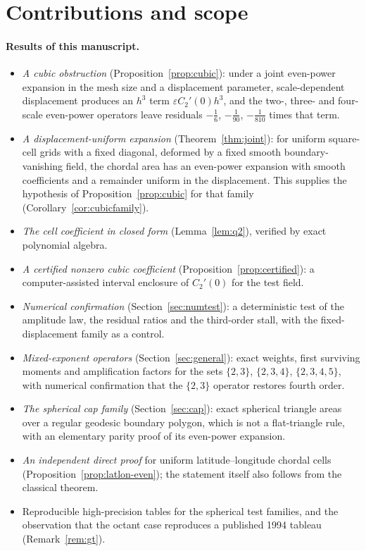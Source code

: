 \documentclass[11pt]{article}
\theoremstyle{remark}
\begin{document}
\section{Contributions and scope}\label{sec:scope}
\paragraph{Results of this manuscript.}
\begin{itemize}
\item \emph{A cubic obstruction} (Proposition~\ref{prop:cubic}): under a joint even-power
expansion in the mesh size and a displacement parameter, scale-dependent displacement
produces an $h^3$ term $\varepsilon C_2'(0)h^3$, and the two-, three- and four-scale
even-power operators leave residuals $-\tfrac16$, $-\tfrac1{90}$, $-\tfrac1{810}$ times that
term.
\item \emph{A displacement-uniform expansion} (Theorem~\ref{thm:joint}): for uniform
square-cell grids with a fixed diagonal, deformed by a fixed smooth boundary-vanishing field,
the chordal area has an even-power expansion with smooth coefficients and a remainder uniform
in the displacement. This supplies the hypothesis of Proposition~\ref{prop:cubic} for that
family (Corollary~\ref{cor:cubicfamily}).
\item \emph{The cell coefficient in closed form} (Lemma~\ref{lem:q2}), verified by exact
polynomial algebra.
\item \emph{A certified nonzero cubic coefficient} (Proposition~\ref{prop:certified}): a
computer-assisted interval enclosure of $C_2'(0)$ for the test field.
\item \emph{Numerical confirmation} (Section~\ref{sec:numtest}): a deterministic test of the
amplitude law, the residual ratios and the third-order stall, with the fixed-displacement
family as a control.
\item \emph{Mixed-exponent operators} (Section~\ref{sec:general}): exact weights, first
surviving moments and amplification factors for the sets $\{2,3\}$, $\{2,3,4\}$,
$\{2,3,4,5\}$, with numerical confirmation that the $\{2,3\}$ operator restores fourth order.
\item \emph{The spherical cap family} (Section~\ref{sec:cap}): exact spherical triangle areas
over a regular geodesic boundary polygon, which is not a flat-triangle rule, with an
elementary parity proof of its even-power expansion.
\item \emph{An independent direct proof} for uniform latitude--longitude chordal cells
(Proposition~\ref{prop:latlon-even}); the statement itself also follows from the classical
theorem.
\item Reproducible high-precision tables for the spherical test families, and the observation
that the octant case reproduces a published 1994 tableau (Remark~\ref{rem:gt}).
\end{itemize}
\end{document}
